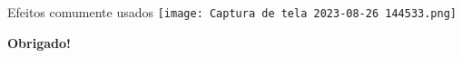 \documentclass{beamer}
\begin{document}
\begin{frame}
    \begin{block}{Efeitos comumente usados}
    \vspace{0.3cm}
        \texttt{[image: Captura de tela 2023-08-26 144533.png]}
    \end{block}
\end{frame}

\begin{frame}
    \begin{center}
        \textbf{\LARGE Obrigado!}
    \end{center}
\end{frame}
\end{document}
